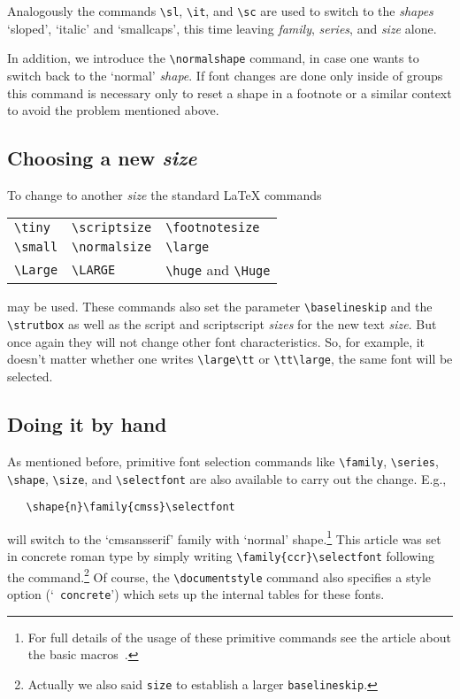  Analogously the commands \verb+\sl+, \verb+\it+, and \verb+\sc+ are
 used to switch to the {\em shapes\/} `sloped', `italic' and
 `smallcaps', this time leaving {\em family}, {\em series}, and {\em
 size\/} alone.

 In addition, we introduce the \verb+\normalshape+ command, in case
 one wants to switch back to the `normal' {\em shape}. If font changes
 are done only inside of groups this command is necessary only to
 reset a shape in a footnote or a similar context to avoid the
 problem mentioned above.


 \subsection{Choosing a new {\em size}}

 To change to another {\em size\/} the standard \LaTeX{} commands
 \begin{center}
   \begin{tabular}{lll}
      \verb+\tiny+  & \verb+\scriptsize+ & \verb+\footnotesize+ \\
      \verb+\small+ & \verb+\normalsize+ & \verb+\large+        \\
      \verb+\Large+ & \verb+\LARGE+ &      \verb+\huge+
                                           and \verb+\Huge+
   \end{tabular}
 \end{center}
 may be used. These commands also set the parameter
 \verb+\baselineskip+ and the \verb+\strutbox+ as well as the
 script and scriptscript {\em sizes\/} for
 the new text {\em size}.  But once again they will not change other
 font characteristics.  So, for example, it doesn't matter whether one
 writes
 \verb+\large\tt+ or \verb+\tt\large+, the same font will be selected.


 \subsection{Doing it by hand}

 As mentioned before, primitive font selection commands like
 \verb+\family+, \verb+\series+, \verb+\shape+, \verb+\size+, and
 \verb+\selectfont+ are also available to carry out the change.
 E.g.,
 \begin{verbatim}
   \shape{n}\family{cmss}\selectfont
\end{verbatim}
 will
 switch to the `cmsansserif' family with `normal' shape.\footnote{For
 full details of the usage of these primitive commands see the article
 about the basic macros~\cite{basic}.}
 This article was set in concrete roman type
 by simply writing \verb+\family{ccr}+\verb+\selectfont+
 following the \verb++
 command.\footnote{Actually we also said
 {\tt\bslash size\string{10\string}\string{13pt\string}} to
 establish a larger {\tt\bslash baselineskip}.}
 Of course, the
 \verb+\documentstyle+ command also specifies a style option (`{\tt
 concrete}') which sets up the internal tables for these fonts.

